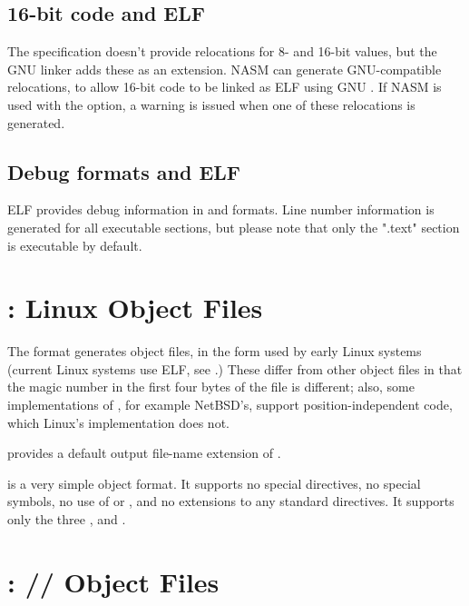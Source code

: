 \subsection{16-bit code and ELF}
\label{subsec:elf16}

The  specification doesn't provide relocations for 8- and
16-bit values, but the GNU  linker adds these as an extension.
NASM can generate GNU-compatible relocations, to allow 16-bit code to
be linked as ELF using GNU . If NASM is used with the
 option, a warning is issued when one of
these relocations is generated.

\subsection{Debug formats and ELF}
\label{subsec:elfdbg}

ELF provides debug information in  and  formats.
Line number information is generated for all executable sections, but please
note that only the ".text" section is executable by default.

\section{: Linux  Object Files}
\label{sec:aoutfmt}

The  format generates  object files, in the
form used by early Linux systems (current Linux systems use ELF, see
.) These differ from other  object
files in that the magic number in the first four bytes of the file is
different; also, some implementations of , for example
NetBSD's, support position-independent code, which Linux's
implementation does not.

 provides a default output file-name extension of .

 is a very simple object format. It supports no special
directives, no special symbols, no use of  or , and no
extensions to any standard directives. It supports only the three
 , 
and .

\section{: //
 Object Files}
\label{sec:aoutfmt}

